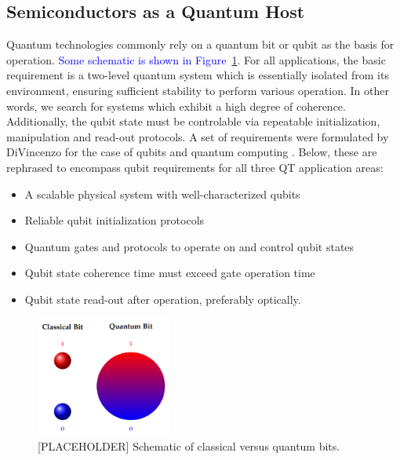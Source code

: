 \documentclass[superscriptaddress,unsortedaddress,
 amsmath,amssymb,
 aps,
]{revtex4-2}
\newcommand{\marianne}[1]{\textcolor{blue}{#1}}
\begin{document}
\subsection*{Semiconductors as a Quantum Host} %
Quantum technologies commonly rely on a quantum bit or qubit as the basis for operation. 
\marianne{Some schematic is shown in Figure~\ref{fig:qt}}. 
For all applications, the basic requirement is a two-level quantum system which is essentially isolated from its environment, ensuring sufficient stability to perform various operation. In other words, we search for systems which exhibit a high degree of coherence. Additionally, the qubit state must be controlable via repeatable initialization, manipulation and read-out protocols.  
A set of requirements were formulated by DiVincenzo for the case of qubits and quantum computing \cite{DiVincenzo2000}. Below, these are rephrased to encompass qubit requirements for all three QT application areas:  
\begin{itemize}
    \item A scalable physical system with well-characterized qubits
    \item Reliable qubit initialization protocols 
    \item Quantum gates and protocols to operate on and control qubit states  
    \item Qubit state coherence time must exceed gate operation time 
    \item Qubit state read-out after operation, preferably optically.  
\end{itemize}

\begin{figure}[t]
    \centering
    \includegraphics[width=0.4\textwidth]{figures/qubit.png}
    \caption{[PLACEHOLDER] Schematic of classical versus quantum bits. }
    \label{fig:qt}
\end{figure}
\end{document}
